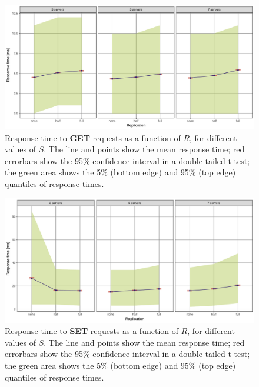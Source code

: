 \documentclass[11pt]{article}
\begin{document}
\begin{figure}[h]
\centering
\includegraphics[width=\textwidth]{../results/replication/graphs/response_time_vs_replication_get.pdf}
\caption{Response time to \textbf{GET} requests as a function of $R$, for different values of $S$. The line and points show the mean response time; red errorbars show the 95\% confidence interval in a double-tailed t-test; the green area shows the 5\% (bottom edge) and 95\% (top edge) quantiles of response times.}
\label{fig:exp2:res:replication:get}
\end{figure}

\begin{figure}[h]
\centering
\includegraphics[width=\textwidth]{../results/replication/graphs/response_time_vs_replication_set.pdf}
\caption{Response time to \textbf{SET} requests as a function of $R$, for different values of $S$. The line and points show the mean response time; red errorbars show the 95\% confidence interval in a double-tailed t-test; the green area shows the 5\% (bottom edge) and 95\% (top edge) quantiles of response times.}
\label{fig:exp2:res:replication:set}
\end{figure}
\end{document}
